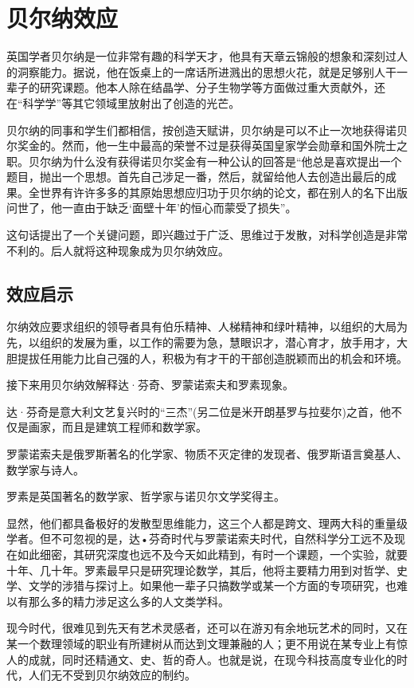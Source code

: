 \documentclass[11pt]{ctexart}
\begin{document}
\section{贝尔纳效应}
\label{sec-9}


英国学者贝尔纳是一位非常有趣的科学天才，他具有天章云锦般的想象和深刻过人的洞察能力。据说，他在饭桌上的一席话所进溅出的思想火花，就是足够别人干一辈子的研究课题。他本人除在结晶学、分子生物学等方面做过重大贡献外，还在“科学学”等其它领域里放射出了创造的光芒。

贝尔纳的同事和学生们都相信，按创造天赋讲，贝尔纳是可以不止一次地获得诺贝尔奖金的。然而，他一生中最高的荣誉不过是获得英国皇家学会勋章和国外院士之职。贝尔纳为什么没有获得诺贝尔奖金有一种公认的回答是“他总是喜欢提出一个题目，抛出一个思想。首先自己涉足一番，然后，就留给他人去创造出最后的成果。全世界有许许多多的其原始思想应归功于贝尔纳的论文，都在别人的名下出版问世了，他一直由于缺乏‘面壁十年’的恒心而蒙受了损失”。

这句话提出了一个关键问题，即兴趣过于广泛、思维过于发散，对科学创造是非常不利的。后人就将这种现象成为贝尔纳效应。
\subsection{效应启示}
\label{sec-9-1}


尔纳效应要求组织的领导者具有伯乐精神、人梯精神和绿叶精神，以组织的大局为先，以组织的发展为重，以工作的需要为急，慧眼识才，潜心育才，放手用才，大胆提拔任用能力比自己强的人，积极为有才干的干部创造脱颖而出的机会和环境。

接下来用贝尔纳效解释达·芬奇、罗蒙诺索夫和罗素现象。

达·芬奇是意大利文艺复兴时的“三杰”(另二位是米开朗基罗与拉斐尔)之首，他不仅是画家，而且是建筑工程师和数学家。

罗蒙诺索夫是俄罗斯著名的化学家、物质不灭定律的发现者、俄罗斯语言奠基人、数学家与诗人。

罗素是英国著名的数学家、哲学家与诺贝尔文学奖得主。

显然，他们都具备极好的发散型思维能力，这三个人都是跨文、理两大科的重量级学者。但不可忽视的是，达•芬奇时代与罗蒙诺索夫时代，自然科学分工远不及现在如此细密，其研究深度也远不及今天如此精到，有时一个课题，一个实验，就要十年、几十年。罗素最早只是研究理论数学，其后，他将主要精力用到对哲学、史学、文学的涉猎与探讨上。如果他一辈子只搞数学或某一个方面的专项研究，也难以有那么多的精力涉足这么多的人文类学科。

现今时代，很难见到先天有艺术灵感者，还可以在游刃有余地玩艺术的同时，又在某一个数理领域的职业有所建树从而达到文理兼融的人；更不用说在某专业上有惊人的成就，同时还精通文、史、哲的奇人。也就是说，在现今科技高度专业化的时代，人们无不受到贝尔纳效应的制约。
\end{document}

